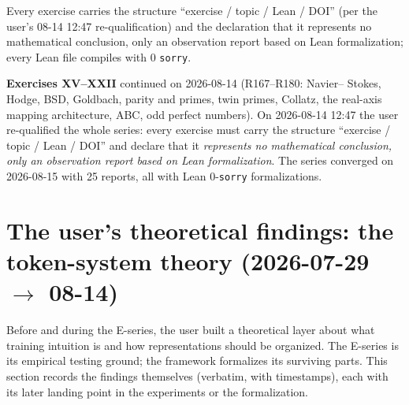 \documentclass[sigplan,10pt,anonymous,review]{acmart}
\begin{document}
Every exercise carries the structure ``exercise / topic / Lean / DOI''
(per the user's 08-14 12:47 re-qualification) and the declaration that it
represents no mathematical conclusion, only an observation report based on
Lean formalization; every Lean file compiles with 0 \texttt{sorry}.

\textbf{Exercises XV--XXII} continued on 2026-08-14 (R167--R180: Navier--
Stokes, Hodge, BSD, Goldbach, parity and primes, twin primes, Collatz, the
real-axis mapping architecture, ABC, odd perfect numbers). On 2026-08-14
12:47 the user re-qualified the whole series: every exercise must carry the
structure ``exercise / topic / Lean / DOI'' and declare that it
\emph{represents no mathematical conclusion, only an observation report
based on Lean formalization}. The series converged on 2026-08-15 with 25
reports, all with Lean 0-\texttt{sorry} formalizations.

\section{The user's theoretical findings: the token-system theory (2026-07-29 $\to$ 08-14)}

Before and during the E-series, the user built a theoretical layer about
what training intuition is and how representations should be organized.
The E-series is its empirical testing ground; the framework formalizes its
surviving parts. This section records the findings themselves (verbatim,
with timestamps), each with its later landing point in the experiments or
the formalization.
\end{document}
